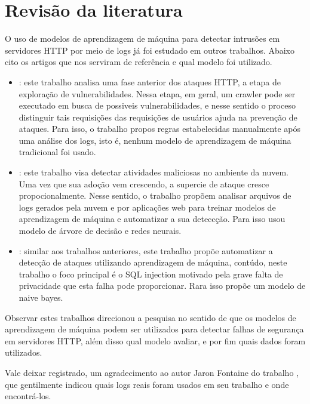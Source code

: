 
\chapter{Revisão da literatura}
\label{cap:fundamentation}

O uso de modelos de aprendizagem de máquina para detectar intrusões em servidores HTTP 
por meio de logs já foi estudado em outros trabalhos. Abaixo cito os artigos que nos
serviram de referência e qual modelo foi utilizado.

\begin{itemize}
    \item \cite{ref:art3}: este trabalho analisa uma fase anterior dos ataques HTTP, a etapa
    de exploração de vulnerabilidades. Nessa etapa, em geral, um crawler pode ser executado 
    em busca de possiveis vulnerabilidades, e nesse sentido o proceso distinguir tais 
    requisições das requisições de usuários ajuda na prevenção de ataques. Para isso, o 
    trabalho propos regras estabelecidas manualmente após uma análise dos logs, isto é, 
    nenhum modelo de aprendizagem de máquina tradicional foi usado.

    \item \cite{ref:art6}: este trabalho visa detectar atividades maliciosas no ambiente 
    da nuvem. Uma vez que sua adoção vem crescendo, a supercie de ataque cresce propocionalmente.
    Nesse sentido, o trabalho propõem analisar arquivos de logs gerados pela nuvem e por aplicações
    web para treinar modelos de aprendizagem de máquina e automatizar a sua deteccção. Para isso
    usou modelo de árvore de decisão e redes neurais.

    \item \cite{ref:art2}: similar aos trabalhos anteriores, este trabalho propõe automatizar
    a detecção de ataques utilizando aprendizagem de máquina, contúdo, neste trabalho
    o foco principal é o SQL injection motivado pela grave falta de privacidade 
    que esta falha pode proporcionar. Rara isso propõe um modelo de naive bayes.
\end{itemize}

Observar estes trabalhos direcionou a pesquisa no sentido de que os modelos de 
aprendizagem de máquina podem ser utilizados para detectar falhas de segurança
em servidores HTTP, além disso qual modelo avaliar, e por fim quais dados foram utilizados.

Vale deixar registrado, um agradecimento ao autor Jaron Fontaine do trabalho \cite{ref:art6}, que gentilmente
indicou quais logs reais foram usados em seu trabalho e onde encontrá-los.